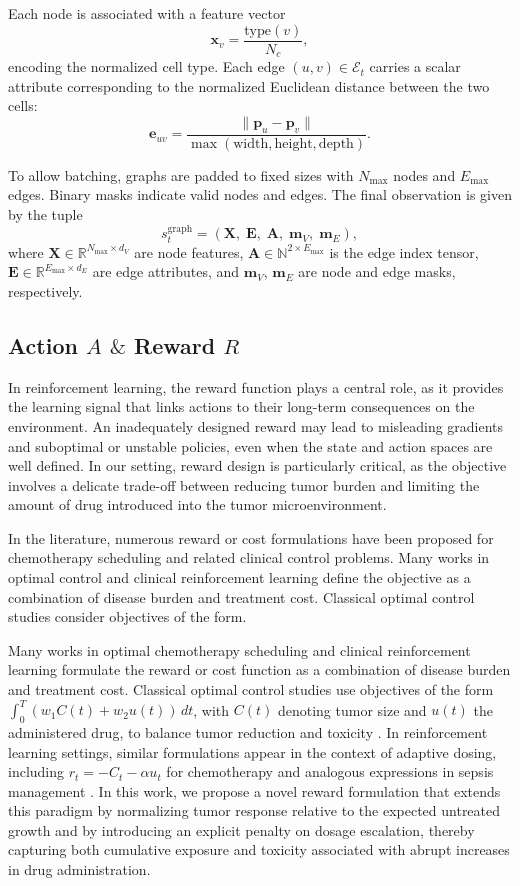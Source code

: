 \documentclass{article}
\begin{document}
Each node is associated with a feature vector
$$
\mathbf{x}_v = \frac{\text{type}(v)}{N_c},
$$
encoding the normalized cell type.
Each edge $(u,v) \in \mathcal{E}_t$ carries a scalar attribute corresponding to the normalized Euclidean distance between the two cells:
$$
\mathbf{e}_{uv} = \frac{\lVert \mathbf{p}_u - \mathbf{p}_v \rVert}{\max(\text{width}, \text{height}, \text{depth})}.
$$

To allow batching, graphs are padded to fixed sizes with $N_{\max}$ nodes and $E_{\max}$ edges.
Binary masks indicate valid nodes and edges.
The final observation is given by the tuple
$$
s_t^{\text{graph}} =
\left(
\mathbf{X},\;
\mathbf{E},\;
\mathbf{A},\;
\mathbf{m}_V,\;
\mathbf{m}_E
\right),
$$
where $\mathbf{X} \in \mathbb{R}^{N_{\max} \times d_V}$ are node features,
$\mathbf{A} \in \mathbb{N}^{2 \times E_{\max}}$ is the edge index tensor,
$\mathbf{E} \in \mathbb{R}^{E_{\max} \times d_E}$ are edge attributes,
and $\mathbf{m}_V$, $\mathbf{m}_E$ are node and edge masks, respectively.

\subsection{Action $A$ $\&$ Reward $R$}
In reinforcement learning, the reward function plays a central role, as it provides the learning signal that links actions to their long-term consequences on the environment. An inadequately designed reward may lead to misleading gradients and suboptimal or unstable policies, even when the state and action spaces are well defined. In our setting, reward design is particularly critical, as the objective involves a delicate trade-off between reducing tumor burden and limiting the amount of drug introduced into the tumor microenvironment.

In the literature, numerous reward or cost formulations have been proposed for chemotherapy scheduling and related clinical control problems. Many works in optimal control and clinical reinforcement learning define the objective as a combination of disease burden and treatment cost. Classical optimal control studies consider objectives of the form.

Many works in optimal chemotherapy scheduling and clinical reinforcement learning formulate the reward or cost function as a combination of disease burden and treatment cost. Classical optimal control studies use objectives of the form  $\int_0^T (w_1 C(t) + w_2 u(t))\,dt$,  with $C(t)$ denoting tumor size and $u(t)$ the administered drug, to balance tumor reduction and toxicity  \cite{ledzewicz2016drug}. In reinforcement learning settings, similar  formulations appear in the context of adaptive dosing, including $r_t = -C_t - \alpha u_t$ for chemotherapy and analogous expressions in sepsis management \cite{raghu2017deep}. In this work, we propose a novel reward formulation that extends this paradigm by normalizing tumor response relative to the expected untreated growth and by introducing an explicit penalty on dosage escalation, thereby capturing both cumulative exposure and toxicity associated with abrupt increases in drug administration.
\end{document}
